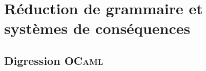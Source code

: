 \section{Réduction de grammaire et systèmes de conséquences}

\subsection{Digression \textsc{OCaml}}




